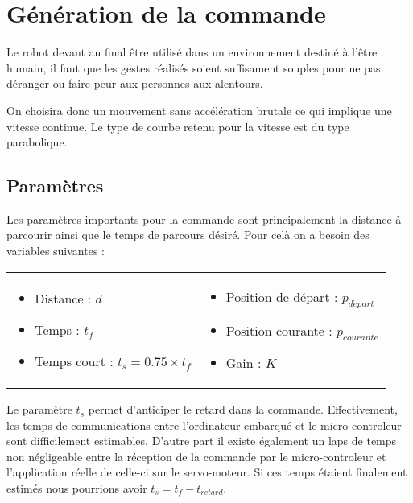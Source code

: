 \section{G\'en\'eration de la commande}
\label{sec:command}

Le robot devant au final \^etre utilis\'e dans un environnement destin\'e \`a l'\^etre humain, il faut que les gestes r\'ealis\'es soient suffisament souples pour ne pas d\'eranger ou faire peur aux personnes aux alentours.

On choisira donc un mouvement sans acc\'el\'eration brutale ce qui implique une vitesse continue.
Le type de courbe retenu pour la vitesse est du type parabolique.

\subsection{Param\`etres}

Les param\`etres importants pour la commande sont principalement la distance \`a parcourir ainsi que le temps de parcours d\'esir\'e. 
Pour cel\`a on a besoin des variables suivantes :\\

\begin{tabular}{l l}
  \begin{minipage}{0.5\linewidth}
    \begin{itemize}
    \item Distance : $d$
    \item Temps : $t_f$
    \item Temps court : $t_s = 0.75 \times t_f$
    \end{itemize}
  \end{minipage}
  &
  \begin{minipage}{0.5\linewidth}
    \begin{itemize}
    \item Position de d\'epart : $p_{d\acute{e}part}$
    \item Position courante : $p_{courante}$
    \item Gain : $K$
    \end{itemize}
  \end{minipage}
\end{tabular}
\vspace{5mm}

Le param\`etre $t_s$ permet d'anticiper le retard dans la commande. Effectivement, les temps de communications entre l'ordinateur embarqu\'e et le micro-controleur sont difficilement estimables. D'autre part il existe \'egalement un laps de temps non n\'egligeable entre la r\'eception de la commande par le micro-controleur et l'application r\'eelle de celle-ci sur le servo-moteur.
Si ces temps \'etaient finalement estim\'es nous pourrions avoir $t_s = t_f - t_{retard}$.

